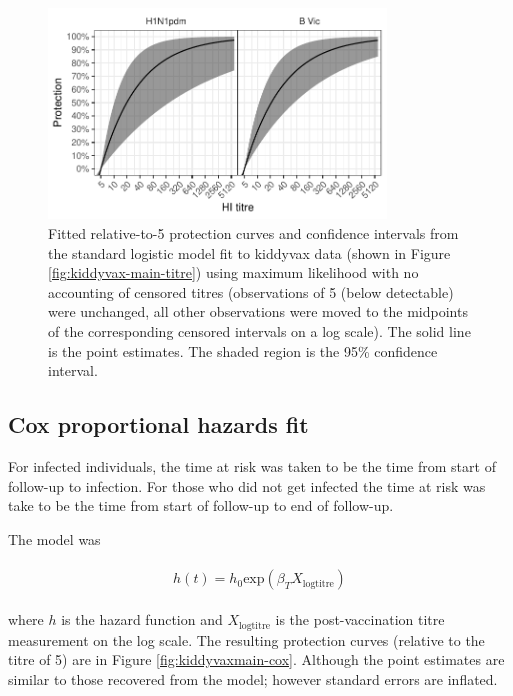 \documentclass[12pt]{article}
\begin{document}
\begin{figure}[htp]
	\centering
	\includegraphics[width=0.8\textwidth]{../fit-logistic-boot-plot/kiddyvaxmain-prot-rel.pdf}
	\caption{
	Fitted relative-to-5 protection curves and confidence intervals from the standard logistic model fit to kiddyvax data (shown in Figure \ref{fig:kiddyvax-main-titre}) using maximum likelihood with no accounting of censored titres (observations of 5 (below detectable) were unchanged, all other observations were moved to the midpoints of the corresponding censored intervals on a log scale). The solid line is the point estimates. The shaded region is the 95\% confidence interval.
	}
	\label{fig:kiddyvaxmain-prot-rel-lr-boot}
\end{figure}

\subsection{Cox proportional hazards fit}

For infected individuals, the time at risk was taken to be the time from start of follow-up to infection. For those who did not get infected the time at risk was take to be the time from start of follow-up to end of follow-up.

The model was

\begin{align*}
\begin{gathered}
h(t) = h_0\text{exp}(\beta_T X_{\text{logtitre}})
\end{gathered}
\end{align*}

where $h$ is the hazard function and $X_{\text{logtitre}}$ is the post-vaccination titre measurement on the log scale. The resulting protection curves (relative to the titre of 5) are in Figure \ref{fig:kiddyvaxmain-cox}. Although the point estimates are similar to those recovered from the model; however standard errors are inflated. 
\end{document}
